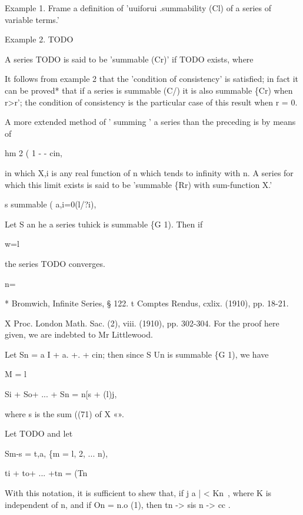 Example 1. Frame a definition of 'uuiforui .summability (Cl) of a
series of variable terms.'

Example 2. TODO


A series TODO is said to be 'summable (Cr)' if TODO exists, where

It follows from example 2 that the 'condition of consistency'
is satisfied; in fact it can be proved* that if a series is summable
(C/) it is also summable \{Cr) when r>r'; the condition of consistency
is the particular case of this result when r = 0.


A more extended method of ' summing ' a series than the preceding is
by means of

hm 2 ( 1 - - cin,

in which X,i is any real function of n which tends to infinity with n.
A series for which this limit exists is said to be 'summable \{Rr)
with sum-function X.'


s summable ( a,i=0(l/?i),

Let S an he a series tuhick is summable \{G 1). Then if

w=l

the series TODO converges.

n=\

* Bromwich, Infinite Series, § 122. t Comptes Rendus, cxlix. (1910),
pp. 18-21.

X Proc. London Math. Sac. (2), viii. (1910), pp. 302-304. For the
proof here given, we are indebted to Mr Littlewood.

Let Sn = a I + a. +. + cin; then since S Un is summable \{G 1), we
have

%
%

M = l

Si + So+ ... + Sn = n[s + (l)j,

where s is the sum ((71) of X «».

Let TODO and let

Sm-s = t,a, \{m = l, 2, ... n),

ti + to+ ... +tn = (Tn

With this notation, it is sufficient to shew that, if j a | < Kn~,
where K is independent of n, and if On = n.o (1), then tn -> sis n ->
cc .

